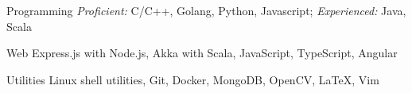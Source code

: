 \begin{cvskills}

  \cvskill
  {Programming}
  {\textit{Proficient: } C/C++, Golang, Python, Javascript; \hspace{0.3cm}
    \textit{Experienced: } Java, Scala}

  \cvskill
  {Web}
  {Express.js with Node.js, Akka with Scala, JavaScript, TypeScript, Angular}

  \cvskill
  {Utilities}
  {Linux shell utilities, Git, Docker,
    MongoDB, OpenCV, \LaTeX, Vim}

\end{cvskills}

